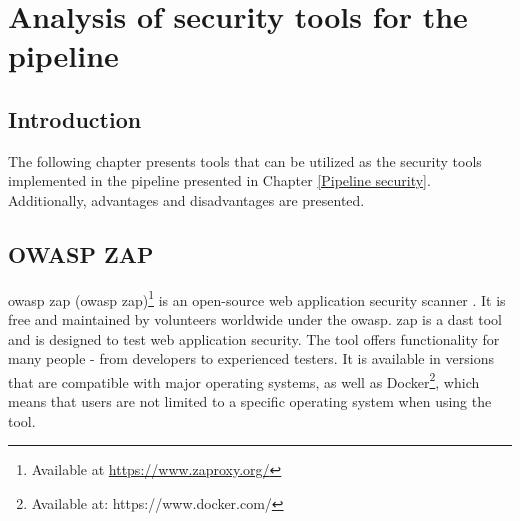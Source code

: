 \newpage
\thispagestyle{empty}
\mbox{}

\chapter{Analysis of security tools for the pipeline}
\label{chap:Tools}

\section{Introduction}
The following chapter presents tools that can be utilized as the security tools implemented in the \gls{pipeline} presented in Chapter \ref{Pipeline security}. Additionally, advantages and disadvantages are presented.  

\section{OWASP ZAP}
\acrshort{owasp} \acrlong{zap} (\acrshort{owasp} \acrshort{zap})\footnote{Available at \url{https://www.zaproxy.org/}} is an open-source web application security scanner \cite{owaspZAP}. It is free and maintained by volunteers worldwide under the \acrlong{owasp}. \acrshort{zap} is a \acrshort{dast} tool and is designed to test web application security. The tool offers functionality for many people - from developers to experienced testers. It is available in versions that are compatible with major operating systems, as well as Docker\footnote{Available at: https://www.docker.com/}, which means that users are not limited to a specific operating system when using the tool.

